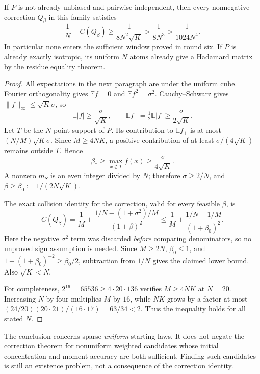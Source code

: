 \begin{theorem}
\label{s32:thm:minimal-buffer-obstruction}
If $P$ is not already unbiased and pairwise independent, then every
nonnegative correction $Q_\beta$ in this family satisfies
\[
 \frac1N-C(Q_\beta)\ge\frac1{8N^2\sqrt K}>
 \frac1{8N^3}>\frac1{1024N^4}.
\]
In particular none enters the sufficient window proved in round six.
If $P$ is already exactly isotropic, its uniform $N$ atoms already
give a Hadamard matrix by the residue equality theorem.
\end{theorem}
\begin{proof}
All expectations in the next paragraph are under the uniform cube.
Fourier orthogonality gives $\mathbb E f=0$ and
$\mathbb E f^2=\sigma^2$. Cauchy--Schwarz gives
$\|f\|_\infty\le\sqrt K\sigma$, so
\[
 \mathbb E|f|\ge\frac{\sigma}{\sqrt K},\qquad
 \mathbb E f_+=\tfrac12\mathbb E|f|
       \ge\frac{\sigma}{2\sqrt K}.
\]
Let $T$ be the $N$-point support of $P$. Its contribution to
$\mathbb E f_+$ is at most $(N/M)\sqrt K\sigma$.
Since $M\ge4NK$, a positive contribution of at least
$\sigma/(4\sqrt K)$ remains outside $T$. Hence
\[
 \beta_*\ge\max_{x\notin T}f(x)
          \ge\frac{\sigma}{4\sqrt K}.
\]
A nonzero $m_S$ is an even integer divided by $N$; therefore
$\sigma\ge2/N$, and
$\beta\ge\beta_0:=1/(2N\sqrt K)$.

The exact collision identity for the correction, valid for every
feasible $\beta$, is
\[
 C(Q_\beta)=\frac1M+
 \frac{1/N-(1+\sigma^2)/M}{(1+\beta)^2}
 \le\frac1M+\frac{1/N-1/M}{(1+\beta_0)^2}.
\]
Here the negative $\sigma^2$ term was discarded \emph{before}
comparing denominators, so no unproved sign assumption is needed.
Since $M\ge2N$, $\beta_0\le1$, and
$1-(1+\beta_0)^{-2}\ge\beta_0/2$, subtraction from $1/N$ gives
the claimed lower bound. Also $\sqrt K<N$.

For completeness, $2^{16}=65536\ge4\cdot20\cdot136$ verifies
$M\ge4NK$ at $N=20$. Increasing $N$ by four multiplies $M$ by
$16$, while $NK$ grows by a factor at most
$(24/20)(20\cdot21)/(16\cdot17)=63/34<2$.
Thus the inequality holds for all stated $N$.
\end{proof}

The conclusion concerns sparse \emph{uniform} starting laws. It does
not negate the correction theorem for nonuniform weighted candidates
whose initial concentration and moment accuracy are both sufficient.
Finding such candidates is still an existence problem, not a
consequence of the correction identity.

